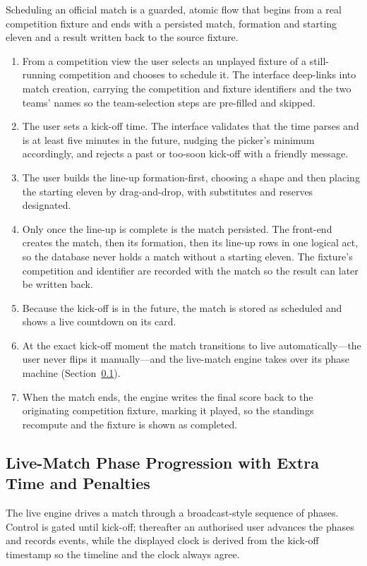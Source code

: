 Scheduling an official match is a guarded, atomic flow that begins from a real
competition fixture and ends with a persisted match, formation and starting eleven and a
result written back to the source fixture.

\begin{enumerate}
  \item From a competition view the user selects an unplayed fixture of a still-running
  competition and chooses to schedule it. The interface deep-links into match creation,
  carrying the competition and fixture identifiers and the two teams' names so the
  team-selection steps are pre-filled and skipped.
  \item The user sets a kick-off time. The interface validates that the time parses and is
  at least five minutes in the future, nudging the picker's minimum accordingly, and
  rejects a past or too-soon kick-off with a friendly message.
  \item The user builds the line-up formation-first, choosing a shape and then placing the
  starting eleven by drag-and-drop, with substitutes and reserves designated.
  \item Only once the line-up is complete is the match persisted. The front-end creates the
  match, then its formation, then its line-up rows in one logical act, so the database
  never holds a match without a starting eleven. The fixture's competition and identifier
  are recorded with the match so the result can later be written back.
  \item Because the kick-off is in the future, the match is stored as scheduled and shows a
  live countdown on its card.
  \item At the exact kick-off moment the match transitions to live automatically---the user
  never flips it manually---and the live-match engine takes over its phase machine
  (Section~\ref{sec:flow-live}).
  \item When the match ends, the engine writes the final score back to the originating
  competition fixture, marking it played, so the standings recompute and the fixture is
  shown as completed.
\end{enumerate}

\subsection{Live-Match Phase Progression with Extra Time and Penalties}
\label{sec:flow-live}

The live engine drives a match through a broadcast-style sequence of phases. Control is
gated until kick-off; thereafter an authorised user advances the phases and records
events, while the displayed clock is derived from the kick-off timestamp so the timeline
and the clock always agree.

